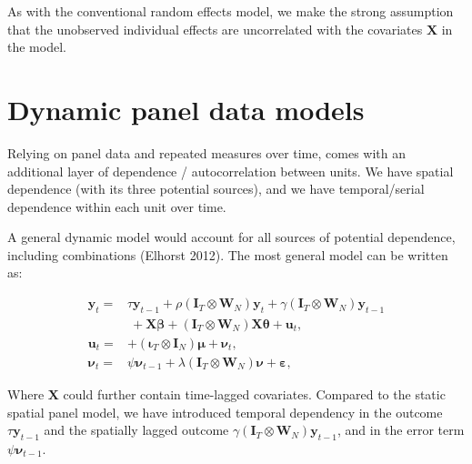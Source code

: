 \documentclass[
  letterpaper,
  DIV=11,
  numbers=noendperiod]{scrreprt}
\begin{document}
As with the conventional random effects model, we make the strong
assumption that the unobserved individual effects are uncorrelated with
the covariates \(\boldsymbol{\mathbf{X}}\) in the model.

\hypertarget{dynamic-panel-data-models}{%
\section{Dynamic panel data models}\label{dynamic-panel-data-models}}

Relying on panel data and repeated measures over time, comes with an
additional layer of dependence / autocorrelation between units. We have
spatial dependence (with its three potential sources), and we have
temporal/serial dependence within each unit over time.

A general dynamic model would account for all sources of potential
dependence, including combinations (Elhorst 2012). The most general
model can be written as:

\[
\begin{split}
        {\boldsymbol{\mathbf{y}}_t}=& \tau \boldsymbol{\mathbf{y}}_{t-1} + \rho(\boldsymbol{\mathbf{I}}_T\otimes {\boldsymbol{\mathbf{W}}_N}){\boldsymbol{\mathbf{y}}}_t
        + \gamma(\boldsymbol{\mathbf{I}}_T\otimes {\boldsymbol{\mathbf{W}}_N}){\boldsymbol{\mathbf{y}}_{t-1}}\\
        &~+ {\boldsymbol{\mathbf{X}}}{\boldsymbol{\mathbf{\beta}}}+ (\boldsymbol{\mathbf{I}}_T\otimes {\boldsymbol{\mathbf{W}}_N}){\boldsymbol{\mathbf{X}}}{\boldsymbol{\mathbf{\theta}}}+ {\boldsymbol{\mathbf{u}}}_t,\\
        {\boldsymbol{\mathbf{u}}_t}=&  + (\boldsymbol{\mathbf{\iota}}_T \otimes {\boldsymbol{\mathbf{I}}_N})\boldsymbol{\mathbf{\mu}}+ {\boldsymbol{\mathbf{\nu}}_t},\\
        {\boldsymbol{\mathbf{\nu}}_t}=& \psi{\boldsymbol{\mathbf{\nu}}}_{t-1} + \lambda(\boldsymbol{\mathbf{I}}_T \otimes {\boldsymbol{\mathbf{W}}_N})\boldsymbol{\mathbf{\nu }}+ {\boldsymbol{\mathbf{\varepsilon}}},
\end{split}     
\]

Where \({\boldsymbol{\mathbf{X}}}\) could further contain time-lagged
covariates. Compared to the static spatial panel model, we have
introduced temporal dependency in the outcome
\(\tau \boldsymbol{\mathbf{y}}_{t-1}\) and the spatially lagged outcome
\(\gamma(\boldsymbol{\mathbf{I}}_T\otimes {\boldsymbol{\mathbf{W}}_N}){\boldsymbol{\mathbf{y}}_{t-1}}\),
and in the error term \(\psi{\boldsymbol{\mathbf{\nu}}}_{t-1}\).
\end{document}
